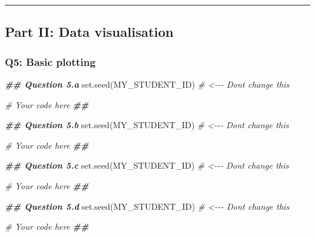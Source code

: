 \documentclass[]{article}
\newenvironment{Shaded}{\begin{snugshade}}{\end{snugshade}}
\newcommand{\CommentTok}[1]{\textcolor[rgb]{0.56,0.35,0.01}{\textit{#1}}}
\newcommand{\DocumentationTok}[1]{\textcolor[rgb]{0.56,0.35,0.01}{\textbf{\textit{#1}}}}
\newcommand{\FunctionTok}[1]{\textcolor[rgb]{0.00,0.00,0.00}{#1}}
\newcommand{\NormalTok}[1]{#1}
\begin{document}
\begin{center}\rule{0.5\linewidth}{0.5pt}\end{center}

\hypertarget{part-ii-data-visualisation}{%
\subsection{Part II: Data
visualisation}\label{part-ii-data-visualisation}}

\hypertarget{q5-basic-plotting}{%
\subsubsection{Q5: Basic plotting}\label{q5-basic-plotting}}

\begin{Shaded}
\begin{Highlighting}[]
\DocumentationTok{\#\# Question 5.a}
\FunctionTok{set.seed}\NormalTok{(MY\_STUDENT\_ID) }\CommentTok{\# \textless{}{-}{-}{-} Don\textquotesingle{}t change this}

\CommentTok{\# Your code here}
\DocumentationTok{\#\#}
\end{Highlighting}
\end{Shaded}

\begin{Shaded}
\begin{Highlighting}[]
\DocumentationTok{\#\# Question 5.b}
\FunctionTok{set.seed}\NormalTok{(MY\_STUDENT\_ID) }\CommentTok{\# \textless{}{-}{-}{-} Don\textquotesingle{}t change this}

\CommentTok{\# Your code here}
\DocumentationTok{\#\#}
\end{Highlighting}
\end{Shaded}

\begin{Shaded}
\begin{Highlighting}[]
\DocumentationTok{\#\# Question 5.c}
\FunctionTok{set.seed}\NormalTok{(MY\_STUDENT\_ID) }\CommentTok{\# \textless{}{-}{-}{-} Don\textquotesingle{}t change this}

\CommentTok{\# Your code here}
\DocumentationTok{\#\#}
\end{Highlighting}
\end{Shaded}

\begin{Shaded}
\begin{Highlighting}[]
\DocumentationTok{\#\# Question 5.d}
\FunctionTok{set.seed}\NormalTok{(MY\_STUDENT\_ID) }\CommentTok{\# \textless{}{-}{-}{-} Don\textquotesingle{}t change this}

\CommentTok{\# Your code here}
\DocumentationTok{\#\#}
\end{Highlighting}
\end{Shaded}
\end{document}
